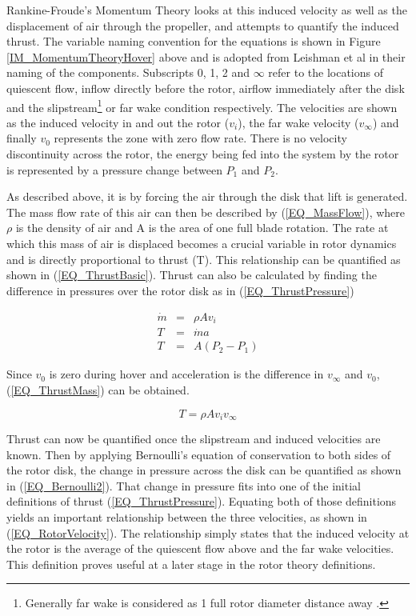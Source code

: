 \documentclass[a4paper, 10pt, conference]{ieeeconf}
\begin{document}
Rankine-Froude's Momentum Theory looks at this induced velocity as well as the displacement of air through the propeller, and attempts to quantify the induced thrust. The variable naming convention for the equations is shown in Figure \ref{IM_MomentumTheoryHover} above and is adopted from Leishman et al \cite{Leishman} in their naming of the components. Subscripts 0, 1, 2 and $\infty$ refer to the locations of quiescent flow, inflow directly before the rotor, airflow immediately after the disk and the slipstream\footnote{Generally far wake is considered as 1 full rotor diameter distance away \cite{Leishman}.} or far wake condition respectively. The velocities are shown as the induced velocity in and out the rotor ($v_{i}$), the far wake velocity ($v_{\infty}$) and finally $v_{0}$ represents the zone with zero flow rate. There is no velocity discontinuity across the rotor, the energy being fed into the system by the rotor is represented by a pressure change between $P_1$ and $P_2$.


As described above, it is by forcing the air through the disk that lift is generated. The mass flow rate of this air can then be described by (\ref{EQ_MassFlow}), where $\rho$ is the density of air and A is the area of one full blade rotation. The rate at which this mass of air is displaced becomes a crucial variable in rotor dynamics and is directly proportional to thrust (T). This relationship can be quantified as shown in (\ref{EQ_ThrustBasic}). Thrust can also be calculated by finding the difference in pressures over the rotor disk as in (\ref{EQ_ThrustPressure})

\begin{eqnarray}
\dot{m} &=& \rho A v_{i}\label{EQ_MassFlow}\\
T &=& \dot{m}a\label{EQ_ThrustBasic}\\
T &=& A(P_2 - P_1)\label{EQ_ThrustPressure}
\end{eqnarray}

Since $v_0$ is zero during hover and acceleration is the difference in $v_\infty$ and $v_0$, (\ref{EQ_ThrustMass}) can be obtained.

\begin{equation}
\label{EQ_ThrustMass}
T = \rho A v_{i} v_\infty
\end{equation}

Thrust can now be quantified once the slipstream and induced velocities are known. Then by applying Bernoulli's equation of conservation to both sides of the rotor disk, the change in pressure across the disk can be quantified as shown in (\ref{EQ_Bernoulli2}).
That change in pressure fits into one of the initial definitions of thrust (\ref{EQ_ThrustPressure}). Equating both of those definitions yields an important relationship between the three velocities, as shown in (\ref{EQ_RotorVelocity}). The relationship simply states that the induced velocity at the rotor is the average of the quiescent flow above and the far wake velocities. This definition proves useful at a later stage in the rotor theory definitions. 
\end{document}

